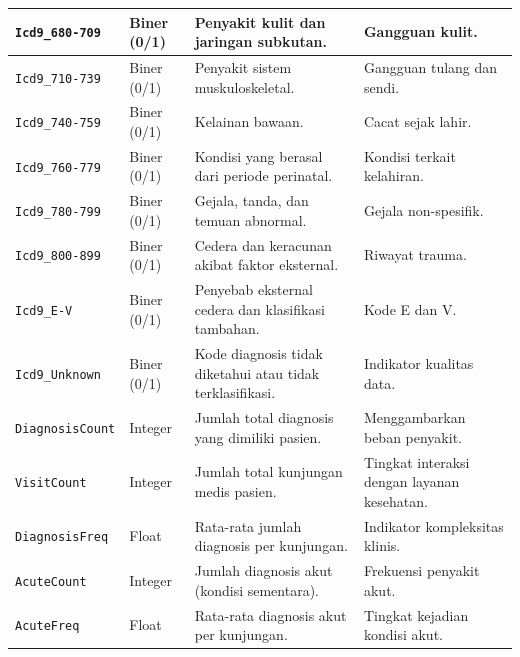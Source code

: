 \begin{longtable}{|L{2.7cm}|C{1.8cm}|L{5.1cm}|L{3.5cm}|}
\texttt{Icd9\_680-709} & Biner (0/1) & Penyakit kulit dan jaringan subkutan. & Gangguan kulit.\\ \hline
\texttt{Icd9\_710-739} & Biner (0/1) & Penyakit sistem muskuloskeletal. & Gangguan tulang dan sendi.\\ \hline
\texttt{Icd9\_740-759} & Biner (0/1) & Kelainan bawaan. & Cacat sejak lahir.\\ \hline
\texttt{Icd9\_760-779} & Biner (0/1) & Kondisi yang berasal dari periode perinatal. & Kondisi terkait kelahiran.\\ \hline
\texttt{Icd9\_780-799} & Biner (0/1) & Gejala, tanda, dan temuan abnormal. & Gejala non-spesifik.\\ \hline
\texttt{Icd9\_800-899} & Biner (0/1) & Cedera dan keracunan akibat faktor eksternal. & Riwayat trauma.\\ \hline
\texttt{Icd9\_E-V} & Biner (0/1) & Penyebab eksternal cedera dan klasifikasi tambahan. & Kode E dan V.\\ \hline
\texttt{Icd9\_Unknown} & Biner (0/1) & Kode diagnosis tidak diketahui atau tidak terklasifikasi. & Indikator kualitas data.\\ \hline
\texttt{DiagnosisCount} & Integer & Jumlah total diagnosis yang dimiliki pasien. & Menggambarkan beban penyakit.\\ \hline
\texttt{VisitCount} & Integer & Jumlah total kunjungan medis pasien. & Tingkat interaksi dengan layanan kesehatan.\\ \hline
\texttt{DiagnosisFreq} & Float & Rata-rata jumlah diagnosis per kunjungan. & Indikator kompleksitas klinis.\\ \hline
\texttt{AcuteCount} & Integer & Jumlah diagnosis akut (kondisi sementara). & Frekuensi penyakit akut.\\ \hline
\texttt{AcuteFreq} & Float & Rata-rata diagnosis akut per kunjungan. & Tingkat kejadian kondisi akut.\\ \hline
\end{longtable}
\normalsize

